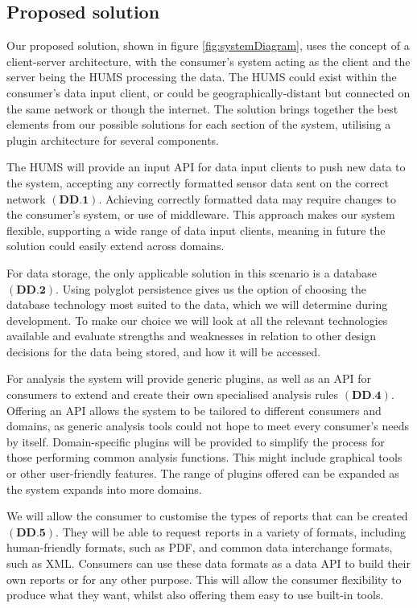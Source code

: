 \documentclass[10pt,a4paper]{article}
\begin{document}
\subsection{Proposed solution}
Our proposed solution, shown in figure \ref{fig:systemDiagram}, uses the 
concept of a client-server architecture, with the consumer's system acting 
as the client and the server being the HUMS processing the data. 
The HUMS could exist within the consumer's data input client, or could be 
geographically-distant but connected on the same network or though the 
internet. The solution brings together the best elements from our
possible solutions for each section of the system, utilising a plugin
architecture for several components. 

The HUMS will provide an input API for data input clients to push new data to the
system, accepting any correctly formatted sensor data sent on the correct
network $(\textbf{DD.1})$. Achieving correctly formatted data may require changes
to the consumer's system, or use of middleware. This approach makes our system
flexible, supporting a wide range of data input clients, meaning in future the
solution could easily extend across domains. 

For data storage, the only applicable solution in this scenario is a database
$(\textbf{DD.2}).$ Using polyglot persistence gives us the option of choosing the
database technology most suited to the data, which we will determine
during development. To make our choice we will look at all the relevant
technologies available and evaluate strengths and weaknesses in relation to
other design decisions for the data being stored, and how it will be accessed. 

For analysis the system will provide generic plugins, as well as an API for
consumers to extend and create their own specialised analysis rules
 $(\textbf{DD.4})$. Offering an API allows the system to be tailored to different 
 consumers and domains, as generic analysis tools
could not hope to meet every consumer's needs by itself.  Domain-specific plugins 
will be provided to simplify the process for those performing common analysis
 functions. This might include graphical tools or other user-friendly features. 
 The range of plugins offered can be expanded as the system expands into 
 more domains. 

We will allow the consumer to customise the types of reports that can be 
created $(\textbf{DD.5})$. They will be able to request reports in a variety of 
formats, including human-friendly formats, such as PDF, and common data interchange
 formats, such as XML. Consumers can use these data formats as a data API to build their own
reports or for any other purpose. This will allow the consumer flexibility to produce 
what they want, whilst also offering them easy to use built-in tools.
\end{document}

